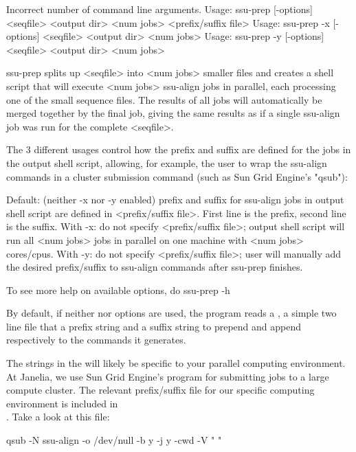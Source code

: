 \begin{sreoutput}
Incorrect number of command line arguments.
Usage: ssu-prep    [-options] <seqfile> <output dir> <num jobs> <prefix/suffix file>
Usage: ssu-prep -x [-options] <seqfile> <output dir> <num jobs>
Usage: ssu-prep -y [-options] <seqfile> <output dir> <num jobs>

ssu-prep splits up <seqfile> into <num jobs> smaller files and creates a shell
script that will execute <num jobs> ssu-align jobs in parallel, each processing
one of the small sequence files. The results of all jobs will automatically be
merged together by the final job, giving the same results as if a single
ssu-align job was run for the complete <seqfile>.

The 3 different usages control how the prefix and suffix are defined for the jobs
in the output shell script, allowing, for example, the user to wrap the ssu-align
commands in a cluster submission command (such as Sun Grid Engine's "qsub"):

Default: (neither -x nor -y enabled) prefix and suffix for ssu-align jobs in
         output shell script are defined in <prefix/suffix file>. First line is
         the prefix, second line is the suffix.
With -x: do not specify <prefix/suffix file>; output shell script will run all
         <num jobs> jobs in parallel on one machine with <num jobs> cores/cpus.
With -y: do not specify <prefix/suffix file>; user will manually add the desired
         prefix/suffix to ssu-align commands after ssu-prep finishes.

To see more help on available options, do ssu-prep -h
\end{sreoutput}

By default, if neither  nor  options are used, the program
reads a , a simple two line file that
a prefix string and a suffix string to prepend and append respectively
to the  commands it generates. 

The strings in the  will likely be specific
to your parallel computing environment. At Janelia, we use Sun Grid
Engine's  program for submitting jobs to a large compute
cluster. The relevant prefix/suffix file for our specific
computing environment is included in \\
. Take a look at this file:

\begin{sreoutput}
qsub -N ssu-align -o /dev/null -b y -j y -cwd -V "
"
\end{sreoutput}

